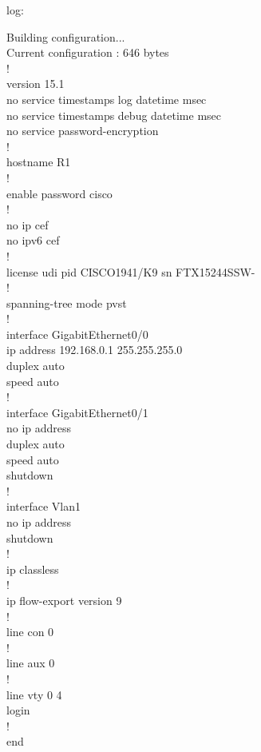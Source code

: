 \documentclass[a4paper,14pt]{extarticle}
\begin{document}
    log:
    \begin{singlespace}
        \begin{tcolorbox}
            Building configuration...\\
            Current configuration : 646 bytes\\
            !\\
            version 15.1\\
            no service timestamps log datetime msec\\
            no service timestamps debug datetime msec\\
            no service password-encryption\\
            !\\
            hostname R1\\
            !\\
            enable password cisco\\
            !\\
            no ip cef\\
            no ipv6 cef\\
            !\\
            license udi pid CISCO1941/K9 sn FTX15244SSW-\\
            !\\
            spanning-tree mode pvst\\
            !\\
            interface GigabitEthernet0/0\\
            ip address 192.168.0.1 255.255.255.0\\
            duplex auto\\
            speed auto\\
            !\\
            interface GigabitEthernet0/1\\
            no ip address\\
            duplex auto\\
            speed auto\\
            shutdown\\
            !\\
            interface Vlan1\\
            no ip address\\
            shutdown\\
            !\\
            ip classless\\
            !\\
            ip flow-export version 9\\
            !\\
            line con 0\\
            !\\
            line aux 0\\
            !\\
            line vty 0 4\\
            login\\
            !\\
            end
        \end{tcolorbox} 
    \end{singlespace}
\end{document}

